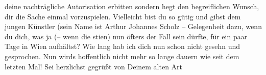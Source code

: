 \begin{ledgroupsized}[t]{13cm}
               deine nachträgliche Autorisation erbitten sondern hegt den begreiflichen Wunsch, dir
               die Sache einmal vorzuspielen. Vielleicht bist du so gütig und gibst dem jungen
               Künstler (sein Name ist {\pb}Arthur Johannes Scholz – Gelegenheit dazu, wenn du
               dich, was ja (– wenn die \label{K_L02299_1v}\label{K_L02299_1h}
               sti{\geminationm}en) nun öfters der Fall sein dürfte, für ein paar Tage
               in Wien aufhältst?\pend
           \pstart
           Wie lang hab ich dich nun schon nicht gesehn und gesprochen. Nun wirds hoffentlich
               nicht mehr so lange dauern wie seit dem letzten Mal!\pend
           \pstart Sei herzlichst gegrüßt von Deinem alten \spacefill\mbox{Art}\pend{}\endnumbering{}\end{ledgroupsized}  \newcommand{\dateiname}{L02299}\newcommand{\titel}{Arthur Schnitzler an Hermann Bahr, 24. 8. 1918}\newcommand{\editorInnen}{ Kurt Ifkovits,  Martin Anton Müller}
            \footnotesize
\begin{ledgroupsized}[t]{11.5cm}
\end{ledgroupsized}
         
      